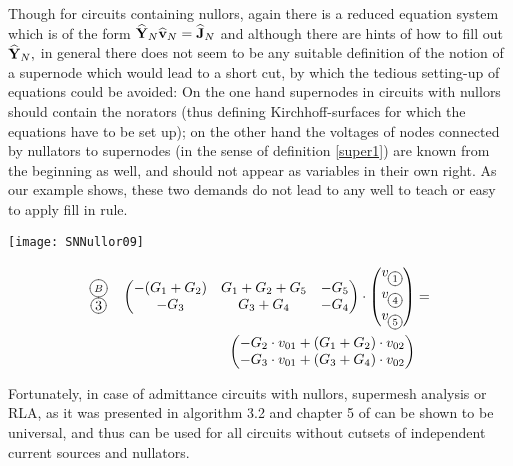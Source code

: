 \documentclass[10pt,journal,twocolumn,pagenumbers]{IEEEtran}
\begin{document}
Though for circuits containing nullors, again there is a reduced equation system which is of the form $\widehat{\bf Y}_N \widehat{\bf v}_N = \widehat{\bf J}_N$ and although there are hints of how to fill out
$\widehat{\bf Y}_N,$ in general there does not seem to be any suitable definition of the notion of a supernode which would lead to a short cut, by which the tedious setting-up of equations could be avoided: On the one hand super\-nodes in circuits with nullors should contain the norators (thus defining Kirchhoff-surfaces for which the equations have to be set up); on the other hand the voltages of nodes connected by nullators to supernodes (in the sense of definition \ref{super1}) are known from the beginning as well, and should not appear as variables in their own right. As our example shows, these two demands do not lead to any well to teach or easy to apply fill in rule.

\begin{center}
\vskip -0.2cm
{\texttt{[image: SNNullor09]}}
\vskip -0.5cm
\end{center}

\begin{equation*}
\begin{split}
\begin{matrix}
{\xy*+{\scriptstyle{B}}*\cir{}\endxy}\\
{\xy*+{{3}}*\cir{}\endxy}
\end{matrix}
\quad
\begin{pmatrix}
- (G_1+G_2) & G_1+G_2+G_5 & - G_5\\
-G_3 & G_3+G_4 & - G_4
\end{pmatrix}
\cdot
\begin{pmatrix}
v_{\xy*+{\scriptstyle{1}}*\cir{}\endxy}\\
v_{\xy*+{\scriptstyle{4}}*\cir{}\endxy}\\
v_{\xy*+{\scriptstyle{5}}*\cir{}\endxy}
\end{pmatrix}
&
=\\
\begin{pmatrix}
- G_2\cdot v_{01} + (G_1+G_2)\cdot v_{02}\\
- G_3\cdot v_{01} + (G_3+G_4)\cdot v_{02}
\end{pmatrix}
&
\end{split}\end{equation*}


 Fortunately, in case of admittance circuits with nullors, supermesh analysis or RLA, as it was presented in algorithm 3.2 and chapter 5 of \cite{SommerSuper} can be shown to be universal, and thus can be used for all circuits without cutsets of independent current sources and nullators.
\end{document}
